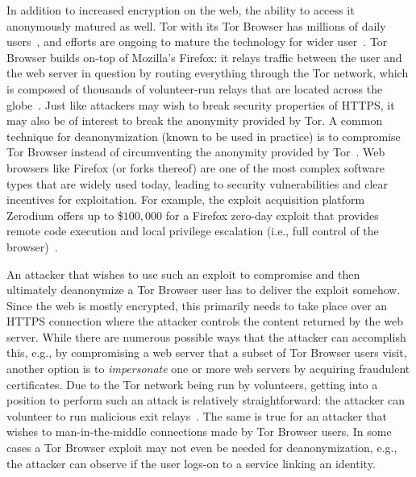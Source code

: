In addition to increased encryption on the web, the ability to access it
anonymously matured as well.  Tor with its Tor Browser has millions of daily
users~\cite{tor,mani}, and efforts are ongoing to mature the technology 
for wider user~\cite{fftor}.  Tor Browser builds on-top of Mozilla's Firefox:
	it relays traffic between the user and the web server in question by routing
		everything through the Tor network,
	which is composed of thousands of volunteer-run relays that are located
		across the globe~\cite{relay-by-flag}.
Just like attackers may wish to break security properties of HTTPS, it may also
be of interest to break the anonymity provided by Tor.  A common technique for
deanonymization (known to be used in practice) is to compromise Tor
Browser instead of circumventing the anonymity provided by
Tor~\cite{selfrando,lepop1,lepop2,zerotor}.  Web browsers like Firefox
(or forks thereof) are one of the most complex software types that are widely
used today, leading to security vulnerabilities and clear incentives for
exploitation.  For example, the exploit acquisition platform Zerodium offers up
to \$$100,000$ for a Firefox zero-day exploit that provides remote code
execution and local privilege escalation (i.e., full control of the
browser)~\cite{zeromain}.

An attacker that wishes to use such an exploit to compromise and then ultimately
deanonymize a Tor Browser user has to deliver the exploit somehow.  Since the
web is mostly encrypted, this primarily needs to take place over an HTTPS
connection where the attacker controls the content returned by the web server.
While there are numerous possible ways that the attacker can accomplish this,
e.g., by compromising a web server that a subset of Tor Browser users visit,
another option is to \emph{impersonate} one or more web servers by acquiring
fraudulent certificates. Due to the Tor network being run by volunteers, getting
into a position to perform such an attack is relatively straightforward:
	the attacker can volunteer to run malicious exit
		relays~\cite{spoiled-onions}.
The same is true for an attacker that wishes to man-in-the-middle connections
made by Tor Browser users.  In some cases a Tor Browser exploit may not even be
needed for deanonymization, e.g., the attacker can observe if the user logs-on
to a service linking an identity.

